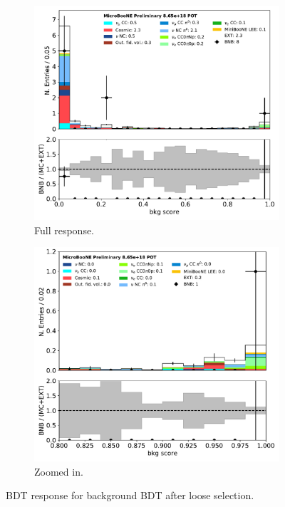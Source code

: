 \documentclass[a4paper]{article}
\begin{document}
\begin{figure}[H] 
\begin{center}
    \begin{subfigure}[b]{0.45\textwidth}
    \centering
    \includegraphics[width=1.00\textwidth]{1e0p/bkg_score_01162020_RUN3_loosesel.pdf}
    \caption{\label{fig:1e0p:bdt:bkgscore:loose} Full response.}
    \end{subfigure}
    \begin{subfigure}[b]{0.45\textwidth}
    \centering
    \includegraphics[width=1.00\textwidth]{1e0p/bkg_score_01162020_RUN3_loosesel_zoom.pdf}
    \caption{\label{fig:1e0p:bdt:bkgscore:loosezoom} Zoomed in.}
    \end{subfigure}
\caption{\label{fig:1e0p:bdt:loose} BDT response for background BDT after loose selection.}
\end{center}
\end{figure}
\end{document}
